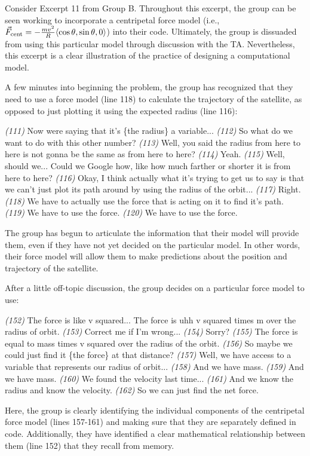 \documentclass{msuphddissertation}
\begin{document}
\begin{doublespace}
Consider Excerpt 11 from Group B.  Throughout this excerpt, the group can be seen working to incorporate a centripetal force model (i.e., $\vec{F}_{\rm cent}=-\frac{mv^{2}}{R}\langle\cos\theta,\sin\theta,0\rangle$) into their code.  Ultimately, the group is dissuaded from using this particular model through discussion with the TA.  Nevertheless, this excerpt is a clear illustration of the practice of designing a computational model.

A few minutes into beginning the problem, the group has recognized that they need to use a force model (line 118) to calculate the trajectory of the satellite, as opposed to just plotting it using the expected radius (line 116): \begin{description}
\SA \textit{(111)} Now were saying that it’s \{the radius\} a variable...
\SA \textit{(112)} So what do we want to do with this {other} number?
\SB \textit{(113)} Well, you said the radius from here to here is not gonna be the same as from here to here?
\SA \textit{(114)} Yeah.
\SB \textit{(115)} Well, should we... Could we Google how, like how much farther or shorter it is from here to here?
\SD \textit{(116)} Okay, I think actually what it's trying to get us to say is that we can't just plot its path around by using the radius of the orbit...
\SA \textit{(117)} Right.
\SD \textit{(118)} We have to actually use the force that is acting on it to find it's path.
\SA \textit{(119)} We have to use the force.
\SD \textit{(120)} We have to use the force.\end{description}  The group has begun to articulate the information that their model will provide them, even if they have not yet decided on the particular model.  In other words, their force model will allow them to make predictions about the position and trajectory of the satellite.

After a little off-topic discussion, the group decides on a particular force model to use: \begin{description}
\SD \textit{(152)} The force is like v squared... The force is uhh v squared times m over the radius of orbit.
\SD \textit{(153)} Correct me if I'm wrong...
\SA \textit{(154)} Sorry?
\SD \textit{(155)} The force is equal to mass times v squared over the radius of the orbit.
\SB \textit{(156)} So maybe we could just find it \{the force\} at that distance?
\SD \textit{(157)} Well, we have access to a variable that represents our radius of orbit...
\SB \textit{(158)} And we have mass.
\SD \textit{(159)} And we have mass.
\SC \textit{(160)} We found the velocity last time...
\SB \textit{(161)} And we know the radius and know the velocity.
\SB \textit{(162)} So we can just find the net force.\end{description}  Here, the group is clearly identifying the individual components of the centripetal force model (lines 157-161) and making sure that they are separately defined in code.  Additionally, they have identified a clear mathematical relationship between them (line 152) that they recall from memory.


\end{doublespace}
\end{document}
